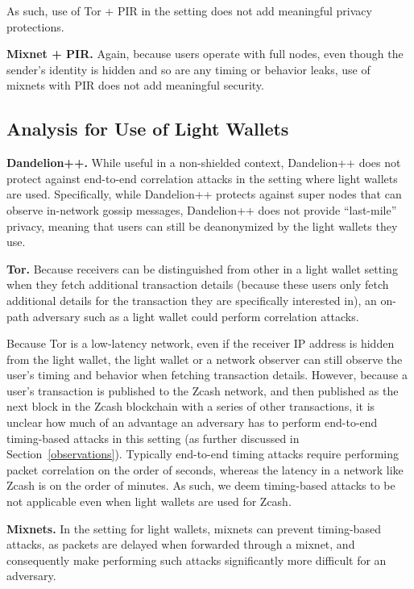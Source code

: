 \documentclass{article}
\begin{document}
As such, use of Tor + PIR in the setting does not add meaningful privacy
protections.

\textbf{Mixnet + PIR.}
Again, because users operate with full nodes, even though the sender's identity
is hidden and so are any timing or behavior leaks, use of mixnets with PIR does
not add meaningful security.

\subsection{Analysis for Use of Light Wallets}

\textbf{Dandelion++.}
While useful in a non-shielded context, Dandelion++ does not protect against
end-to-end correlation attacks in the setting where light wallets are used.
Specifically, while Dandelion++ protects against super nodes that can observe
in-network gossip messages, Dandelion++ does not provide ``last-mile'' privacy,
meaning that users can still be deanonymized by the light wallets they use.

\textbf{Tor.}
Because receivers can be distinguished from other in a light wallet setting
when they fetch additional transaction details (because these users only fetch
additional details for the transaction they are specifically interested in),
an on-path adversary such as a light wallet could perform correlation attacks.

Because Tor is a low-latency
network, even if the receiver IP address is hidden from the light wallet, the
light wallet or a network observer can still observe the user's timing and
behavior when fetching transaction details. However, because a user's
transaction is published to the Zcash network, and then published as the next
block in the Zcash blockchain with a series of other transactions, it is
unclear how much of an advantage an adversary has to perform end-to-end
timing-based attacks in this setting (as further discussed in
Section~\ref{observations}). Typically end-to-end timing attacks
require performing packet correlation on the order of seconds, whereas the
latency in a network like Zcash is on the order of minutes. As such, we deem
timing-based attacks to be not applicable even when light wallets are used for
Zcash.

\textbf{Mixnets.}
In the setting for light wallets, mixnets can prevent timing-based attacks, as
packets are delayed when forwarded through a mixnet, and consequently make
performing such attacks significantly more difficult for an adversary.
\end{document}
